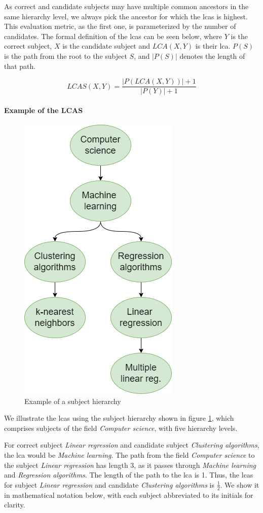As correct and candidate subjects may have multiple common ancestors in the same hierarchy level, we always pick the ancestor for which the \acrshort{lcas} is highest. This evaluation metric, as the first one, is parameterized by the number of candidates. The formal definition of the \acrshort{lcas} can be seen below, where $Y$ is the correct subject, $X$ is the candidate subject and $LCA(X,Y)$ is their \acrshort{lca}. $P(S)$ is the path from the root to the subject $S$, and $|P(S)|$ denotes the length of that path.

$$ LCAS(X, Y) = \frac{|P(LCA(X, Y))|+1}{|P(Y)|+1}$$

\paragraph{Example of the LCAS} \mbox{}

\begin{figure}
    \centering
    \includegraphics[width=.4\textwidth]{figures/evaluation/subject_hierarchy_example.png}
    \caption{Example of a subject hierarchy}
    \label{fig:subject_hierarchy_example}
\end{figure}

We illustrate the \acrshort{lcas} using the subject hierarchy shown in figure \ref{fig:subject_hierarchy_example}, which comprises subjects of the field \textit{Computer science}, with five hierarchy levels.

For correct subject \textit{Linear regression} and candidate subject \textit{Clustering algorithms}, the \acrshort{lca} would be \textit{Machine learning}. The path from the field \textit{Computer science} to the subject \textit{Linear regression} has length 3, as it passes through \textit{Machine learning} and \textit{Regression algorithms}. The length of the path to the \acrshort{lca} is 1. Thus, the \acrshort{lcas} for subject \textit{Linear regression} and candidate \textit{Clustering algorithms} is $\frac{1}{2}$. We show it in mathematical notation below, with each subject abbreviated to its initials for clarity.

